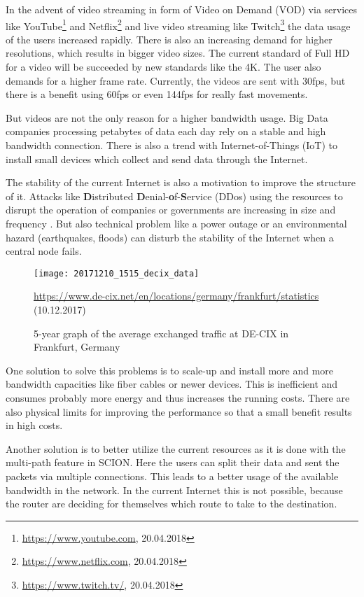 \documentclass[thesis.tex]{subfiles}
\begin{document}
In the advent of video streaming in form of Video on Demand (VOD) via services like YouTube\footnote{\url{https://www.youtube.com}, 20.04.2018} and Netflix\footnote{\url{https://www.netflix.com}, 20.04.2018} and live video streaming like Twitch\footnote{\url{https://www.twitch.tv/}, 20.04.2018} the data usage of the users increased rapidly. There is also an increasing demand for higher resolutions, which results in bigger video sizes. The current standard of Full HD for a video will be succeeded by new standards like the 4K. The user also demands for a higher frame rate. Currently, the videos are sent with 30fps, but there is a benefit using 60fps or even 144fps for really fast movements.

But videos are not the only reason for a higher bandwidth usage. Big Data companies processing petabytes of data each day rely on a stable and high bandwidth connection. There is also a trend with Internet-of-Things (IoT) to install small devices which collect and send data through the Internet.

The stability of the current Internet is also a motivation to improve the structure of it. Attacks like \textbf{D}istributed \textbf{D}enial-\textbf{o}f-\textbf{S}ervice (DDos) using the resources to disrupt the operation of companies or governments are increasing in size and frequency \cite{GoogleInc.2013}. But also technical problem like a power outage \cite{DECIX.10.04.2018} or an environmental hazard (earthquakes, floods) can disturb the stability of the Internet when a central node fails. 

\begin{figure}
    \centering
    \texttt{[image: 20171210\_1515\_decix\_data]}
    \caption*{\tiny{ \url{https://www.de-cix.net/en/locations/germany/frankfurt/statistics} (10.12.2017)}}
    \caption{5-year graph of the average exchanged traffic at DE-CIX in Frankfurt, Germany}
    \label{fig:intro:decixData}
\end{figure}

One solution to solve this problems is to scale-up and install more and more bandwidth capacities like fiber cables or newer devices. This is inefficient and consumes probably more energy and thus increases the running costs. There are also physical limits for improving the performance so that a small benefit results in high costs.

Another solution is to better utilize the current resources as it is done with the multi-path feature in SCION. Here the users can split their data and sent the packets via multiple connections. This leads to a better usage of the available bandwidth in the network. In the current Internet this is not possible, because the router are deciding for themselves which route to take to the destination. 
\end{document}
